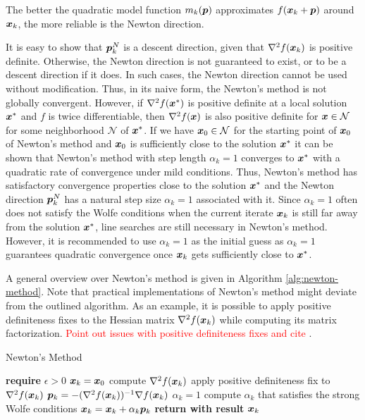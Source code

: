 \noindent The better the quadratic model function $m_k(\bm{p})$ approximates $f(\bm{x}_k + \bm{p})$ around $\bm{x}_k$, the more reliable is the 
Newton direction. 

It is easy to show that $\bm{p}^N_k$ is a descent direction, given that $\nabla^2 f(\bm{x}_k)$ is positive definite. 
Otherwise, the Newton direction is not guaranteed to exist, or to be a descent direction if it does. In such cases, the Newton direction cannot 
be used without modification. Thus, in its naive form, the Newton's method is not globally convergent. However, if $\nabla^2 f(\bm{x}^*)$ is positive
definite at a local solution $\bm{x}^*$ and $f$ is twice differentiable, then $\nabla^2 f(\bm{x})$ is also positive definite for $\bm{x} \in 
\mathcal{N}$ for some neighborhood $\mathcal{N}$ of $\bm{x}^*$. If we have $\bm{x}_0 \in \mathcal{N}$ for the starting point of $\bm{x}_0$
of Newton's method and $\bm{x}_0$ is sufficiently close to the solution $\bm{x}^*$ it can be shown that Newton's method with step length
$\alpha_k = 1$ converges to $\bm{x}^*$ with a quadratic rate of convergence under mild conditions. Thus, Newton's method 
has satisfactory convergence properties close to the solution $\bm{x}^*$ and the Newton direction $\bm{p}^N_k$ has a natural step size 
$\alpha_k = 1$ associated with it. Since $\alpha_k = 1$ often does not satisfy the Wolfe conditions when the current iterate $\bm{x}_k$ is still 
far away from the solution $\bm{x}^*$, line searches are still necessary in Newton's method. However, it is recommended to use $\alpha_k = 1$ as the
initial guess as $\alpha_k = 1$ guarantees quadratic convergence once $\bm{x}_k$ gets sufficiently close to $\bm{x}^*$.

A general overview over Newton's method is given in Algorithm \ref{alg:newton-method}. Note that practical implementations of Newton's method might deviate
from the outlined algorithm. As an example, it is possible to apply positive definiteness fixes to the Hessian matrix $\nabla^2 f(\bm{x}_k)$
while computing its matrix factorization. \textcolor{red}{Point out issues with positive definiteness fixes and cite \cite{longva2023}}.

\begin{algorithm}
\caption{Newton's Method}\label{alg:newton-method}
\begin{algorithmic}
\State \textbf{require } $\epsilon > 0$
\State $\bm{x}_k = \bm{x}_0$
\State compute $\nabla^2 f(\bm{x}_k)$
\State apply positive definiteness fix to $\nabla^2 f(\bm{x}_k)$
\EndIf
\State $\bm{p}_k = -(\nabla^2 f(\bm{x}_k))^{-1} \nabla f(\bm{x}_k)$
\State $\alpha_k = 1$
\State compute $\alpha_k$ that satisfies the strong Wolfe conditions
\EndIf
\State $\bm{x}_k = \bm{x}_k + \alpha_k \bm{p}_k$
\EndWhile
\State \textbf{return with result } $\bm{x}_k$
\EndProcedure
\end{algorithmic}
\end{algorithm}

